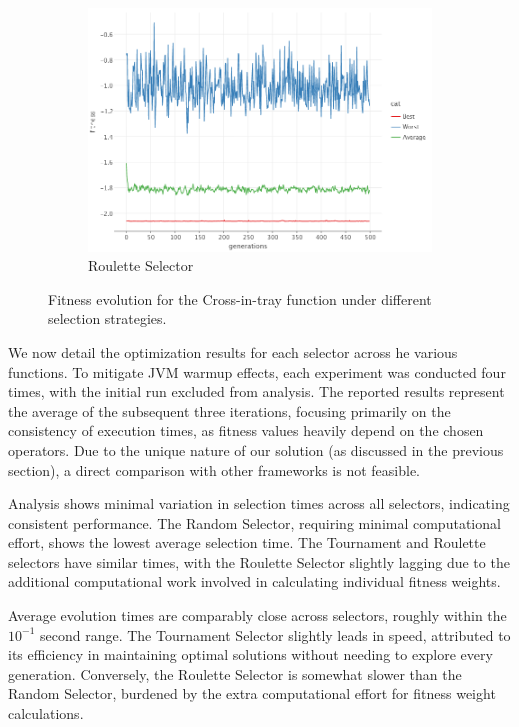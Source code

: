 \begin{figure}[ht!]
\begin{subfigure}{.45\textwidth}
            \includegraphics[width=\linewidth]{img/cross_in_tray_roulette.png}
            \caption{Roulette Selector}
        \end{subfigure}
        \caption{Fitness evolution for the Cross-in-tray function under different selection strategies.}
        \label{fig:fn_opt:results:cross_in_tray}
    \end{figure}

    We now detail the optimization results for each selector across he various functions. To mitigate JVM warmup 
    effects, each experiment was conducted four times, with the initial run excluded from analysis. The reported 
    results represent the average of the subsequent three iterations, focusing primarily on the consistency of 
    execution times, as fitness values heavily depend on the chosen operators. Due to the unique nature of our solution 
    (as discussed in the previous section), a direct comparison with other frameworks is not feasible.

    Analysis shows minimal variation in selection times across all selectors, indicating consistent performance. The 
    Random Selector, requiring minimal computational effort, shows the lowest average selection time. The Tournament 
    and Roulette selectors have similar times, with the Roulette Selector slightly lagging due to the additional 
    computational work involved in calculating individual fitness weights.
    
    Average evolution times are comparably close across selectors, roughly within the \(10^{-1}\) second range. The 
    Tournament Selector slightly leads in speed, attributed to its efficiency in maintaining optimal solutions without 
    needing to explore every generation. Conversely, the Roulette Selector is somewhat slower than the Random Selector, 
    burdened by the extra computational effort for fitness weight calculations.
    
